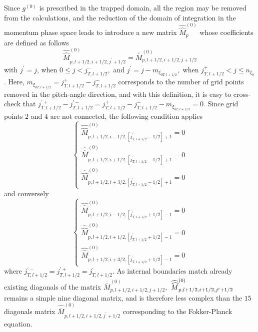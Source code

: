 Since $g^{\left( 0\right) }$ is prescribed in the trapped domain, all the
region may be removed from the calculations, and the reduction of the domain
of integration in the momentum phase space leads to introduce a new matrix $%
\widehat{\widehat{M}}_{p}^{\left( 0\right) }$ whose coefficients are defined
as follows
\begin{equation}
\widehat{\widehat{M}}_{p,l+1/2,i+1/2,j^{\prime }+1/2}^{\left( 0\right) }=%
\overline{\overline{M}}_{p,l+1/2,i+1/2,j+1/2}^{\left( 0\right) }
\end{equation}
with $j^{\prime }=j$, when $0\leq j<j_{T,l+1/2}^{-},$ and $j^{\prime
}=j-m_{\xi _{0T,l+1/2}},$ when $j_{T,l+1/2}^{+}<j\leq n_{\xi _{0}}$. Here, $%
m_{\xi _{0T,l+1/2}}=j_{T,l+1/2}^{+}-j_{T,l+1/2}^{-}$ corresponds to the
number of grid points removed in the pitch-angle direction, and with this
definition, it is easy to cross-check that $j_{T,l+1/2}^{\prime
+}-j_{T,l+1/2}^{\prime -}=j_{T,l+1/2}^{+}-j_{T,l+1/2}^{-}-m_{\xi
_{0T,l+1/2}}=0.$ Since grid points $2$ and $4$ are not connected, the
following condition applies
\begin{equation}
\left\{
\begin{array}{l}
\widehat{\widehat{M}}_{p,l+1/2,i-1/2,\left[ j_{T,l+1/2}^{\prime }-1/2\right]
+1}^{\left( 0\right) }=0 \\
\widehat{\widehat{M}}_{p,l+1/2,i+1/2,\left[ j_{T,l+1/2}^{\prime }-1/2\right]
+1}^{\left( 0\right) }=0 \\
\widehat{\widehat{M}}_{p,l+1/2,i+3/2,\left[ j_{T,l+1/2}^{\prime }-1/2\right]
+1}^{\left( 0\right) }=0
\end{array}
\right.
\end{equation}
and conversely
\begin{equation}
\left\{
\begin{array}{l}
\widehat{\widehat{M}}_{p,l+1/2,i-1/2,\left[ j_{T,l+1/2}^{\prime }+1/2\right]
-1}^{\left( 0\right) }=0 \\
\widehat{\widehat{M}}_{p,l+1/2,i+1/2,\left[ j_{T,l+1/2}^{\prime }+1/2\right]
-1}^{\left( 0\right) }=0 \\
\widehat{\widehat{M}}_{p,l+1/2,i+3/2,\left[ j_{T,l+1/2}^{\prime }+1/2\right]
-1}^{\left( 0\right) }=0
\end{array}
\right.
\end{equation}
where $j_{T,l+1/2}^{\prime -}=j_{T,l+1/2}^{\prime +}=j_{T,l+1/2}^{\prime }.$
As internal boundaries match already existing diagonals of the matrix $%
\overline{\overline{M}}_{p,l+1/2,i+1/2,j+1/2}^{\left( 0\right) },$ $\widehat{%
\widehat{M}}_{p,l+1/2,i+1/2,j^{\prime }+1/2}^{\left( 0\right) }$ remains a
simple nine diagonal matrix, and is therefore less complex than the $15$
diagonals matrix $\widehat{\overline{M}}_{p,l+1/2,i+1/2,j^{\prime
}+1/2}^{\left( 0\right) }$ corresponding to the Fokker-Planck equation.

